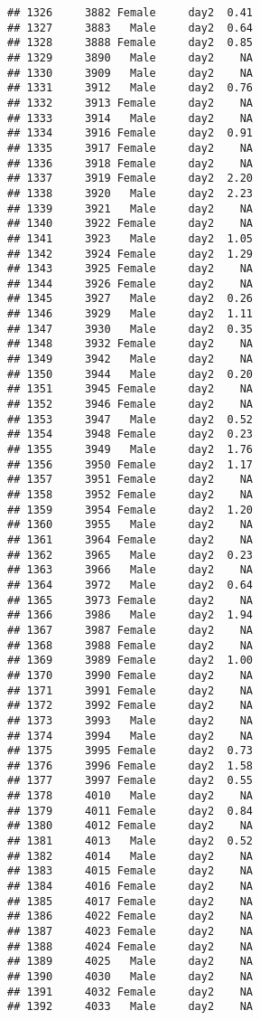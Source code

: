 \documentclass[
]{article}
\begin{document}
\begin{verbatim}
## 1326     3882 Female     day2  0.41
## 1327     3883   Male     day2  0.64
## 1328     3888 Female     day2  0.85
## 1329     3890   Male     day2    NA
## 1330     3909   Male     day2    NA
## 1331     3912   Male     day2  0.76
## 1332     3913 Female     day2    NA
## 1333     3914   Male     day2    NA
## 1334     3916 Female     day2  0.91
## 1335     3917 Female     day2    NA
## 1336     3918 Female     day2    NA
## 1337     3919 Female     day2  2.20
## 1338     3920   Male     day2  2.23
## 1339     3921   Male     day2    NA
## 1340     3922 Female     day2    NA
## 1341     3923   Male     day2  1.05
## 1342     3924 Female     day2  1.29
## 1343     3925 Female     day2    NA
## 1344     3926 Female     day2    NA
## 1345     3927   Male     day2  0.26
## 1346     3929   Male     day2  1.11
## 1347     3930   Male     day2  0.35
## 1348     3932 Female     day2    NA
## 1349     3942   Male     day2    NA
## 1350     3944   Male     day2  0.20
## 1351     3945 Female     day2    NA
## 1352     3946 Female     day2    NA
## 1353     3947   Male     day2  0.52
## 1354     3948 Female     day2  0.23
## 1355     3949   Male     day2  1.76
## 1356     3950 Female     day2  1.17
## 1357     3951 Female     day2    NA
## 1358     3952 Female     day2    NA
## 1359     3954 Female     day2  1.20
## 1360     3955   Male     day2    NA
## 1361     3964 Female     day2    NA
## 1362     3965   Male     day2  0.23
## 1363     3966   Male     day2    NA
## 1364     3972   Male     day2  0.64
## 1365     3973 Female     day2    NA
## 1366     3986   Male     day2  1.94
## 1367     3987 Female     day2    NA
## 1368     3988 Female     day2    NA
## 1369     3989 Female     day2  1.00
## 1370     3990 Female     day2    NA
## 1371     3991 Female     day2    NA
## 1372     3992 Female     day2    NA
## 1373     3993   Male     day2    NA
## 1374     3994   Male     day2    NA
## 1375     3995 Female     day2  0.73
## 1376     3996 Female     day2  1.58
## 1377     3997 Female     day2  0.55
## 1378     4010   Male     day2    NA
## 1379     4011 Female     day2  0.84
## 1380     4012 Female     day2    NA
## 1381     4013   Male     day2  0.52
## 1382     4014   Male     day2    NA
## 1383     4015 Female     day2    NA
## 1384     4016 Female     day2    NA
## 1385     4017 Female     day2    NA
## 1386     4022 Female     day2    NA
## 1387     4023 Female     day2    NA
## 1388     4024 Female     day2    NA
## 1389     4025   Male     day2    NA
## 1390     4030   Male     day2    NA
## 1391     4032 Female     day2    NA
## 1392     4033   Male     day2    NA

\end{verbatim}
\end{document}
